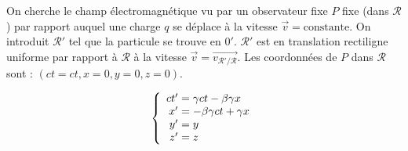 \begin{app}
	On cherche le champ électromagnétique vu par un observateur fixe $P$ fixe (dans $\mathcal{R}$) par rapport auquel une charge $q$ se déplace à la vitesse $\vec{v}=\text{constante}$. On introduit $\mathcal{R'}$ tel que la particule se trouve en $0'$. $\mathcal{R'}$ est en translation rectiligne uniforme par rapport à $\mathcal{R}$ à la vitesse $\vec{v}=\vec{v_{\mathcal{R'}/\mathcal{R}}}$. Les coordonnées de $P$ dans $\mathcal{R}$ sont : $(ct=ct,x=0,y=0,z=0)$.
\begin{center}
	\begin{minipage}{0.45\textwidth}
%			
	\end{minipage}
	\begin{minipage}{0.45\textwidth}
		{\renewcommand*{\arraystretch}{1.2}$$
			\left\{ \begin{array}{r@{\;}l}
				ct'&=\gamma ct-\beta\gamma x\\
				x'&=-\beta\gamma ct+\gamma x\\
				y'&=y\\
				z'&=z
			\end{array} \right.
		$$}
	\end{minipage}
\end{center}


\end{app}
